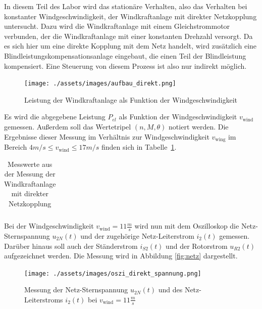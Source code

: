 \documentclass{report}
\begin{document}
In diesem Teil des Labor wird das stationäre Verhalten, also das Verhalten bei konstanter Windgeschwindigkeit, der Windkraftanlage mit direkter Netzkopplung untersucht. Dazu wird die Windkraftanlage mit einem Gleichstrommotor verbunden, der die Windkraftanlage mit einer konstanten Drehzahl versorgt. Da es sich hier um eine direkte Kopplung mit dem Netz handelt, wird zusätzlich eine Blindleistungskompensationsanlage eingebaut, die einen Teil der Blindleistung kompensiert. Eine Steuerung von diesem Prozess ist also nur indirekt möglich.

\begin{figure}[!ht]
	\centering
	\texttt{[image: ./assets/images/aufbau\_direkt.png]}
	\caption{Leistung der Windkraftanlage als Funktion der Windgeschwindigkeit}
	\label{fig:aufbau_direkt}
\end{figure}

Es wird die abgegebene Leistung $P_{el}$ als Funktion der Windgeschwindigkeit $v_{\mathrm{wind}}$ gemessen. Außerdem soll das Wertetripel $(n, M, \theta)$ notiert werden. Die Ergebnisse dieser Messung im Verhältnis zur Windgeschwindigkeit $v_{\mathrm{wing}}$ im Bereich $4m/s\leq v_{\mathrm{wind}} \leq 17m/s$ finden sich in Tabelle~\ref{tab:direkt_pel}.
\begin{table}[!ht]
  \centering
  \begin{tabular}{}

  \end{tabular}
  \caption{Messwerte aus der Messung der Windkraftanlage mit direkter Netzkopplung}
  \label{tab:direkt_pel}
\end{table}

Bei der Windgeschwindigkeit $v_{\mathrm{wind}} = 11 \frac{m}{s}$ wird nun mit dem Oszilloskop die Netz-Sternspannung $u_{2N}(t)$ und der zugehörige Netz-Leiterstrom $i_{2}(t)$ gemessen. Darüber hinaus soll auch der Ständerstrom $i_{S2}(t)$ und der Rotorstrom $u_{R2}(t)$ aufgezeichnet werden. Die Messung wird in Abbildung \ref{fig:netz} dargestellt.

\begin{figure}[!ht]
	\centering
	\texttt{[image: ./assets/images/oszi\_direkt\_spannung.png]}
	\caption{Messung der Netz-Sternspannung $u_{2N}(t)$ und des Netz-Leiterstroms $i_{2}(t)$ bei $v_{\mathrm{wind}} = 11 \frac{m}{s}$}
	\label{fig:oszi_direkt_spannung}
\end{figure}
\end{document}

